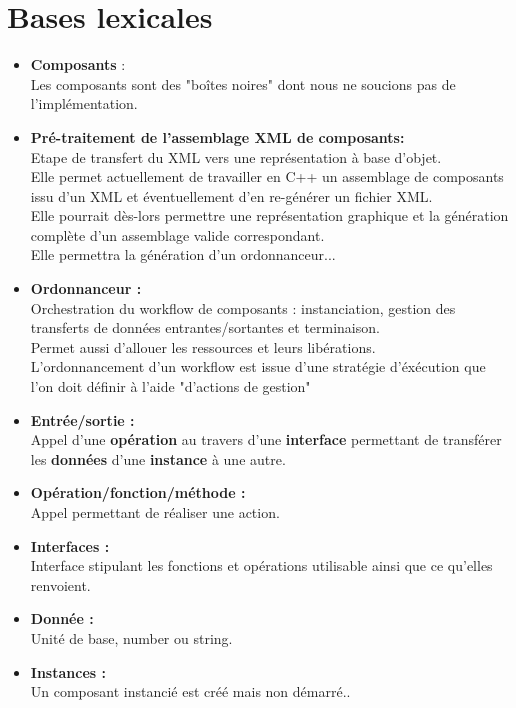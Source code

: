 \documentclass{article}
\begin{document}
\section{Bases lexicales}
\begin{itemize}

    \item \textbf{Composants} :\\
    Les composants sont des "boîtes noires" dont nous ne soucions pas de l'implémentation.

    \item \textbf{Pré-traitement de l'assemblage XML de composants:}\\
    Etape de transfert du XML vers une représentation à base d'objet.\\
    Elle permet actuellement de travailler en C++ un assemblage de composants issu d'un XML et éventuellement d'en re-générer un fichier XML.\\
    Elle pourrait dès-lors permettre une représentation graphique et la génération complète d'un assemblage valide correspondant.\\
    Elle permettra la génération d'un ordonnanceur...

    \item \textbf{Ordonnanceur :}\\
    Orchestration du workflow de composants : instanciation, gestion des transferts de données entrantes/sortantes et terminaison.\\
    Permet aussi d'allouer les ressources et leurs libérations.\\
    L'ordonnancement d'un workflow est issue d'une stratégie d'éxécution que l'on doit définir à l'aide "d'actions de gestion"%

    \item \textbf{Entrée/sortie :}\\
    Appel d'une \textbf{opération} au travers d'une \textbf{interface} permettant de transférer les \textbf{données} d'une \textbf{instance} à une autre.

    \item \textbf{Opération/fonction/méthode :}\\
    Appel permettant de réaliser une action.

    \item \textbf{Interfaces :}\\
    Interface stipulant les fonctions et opérations utilisable ainsi que ce qu'elles renvoient.%

    \item \textbf{Donnée :}\\
    Unité de base, number ou string.%

    \item \textbf{Instances :}\\
    Un composant instancié est créé mais non démarré..%

\end{itemize}
\end{document}
